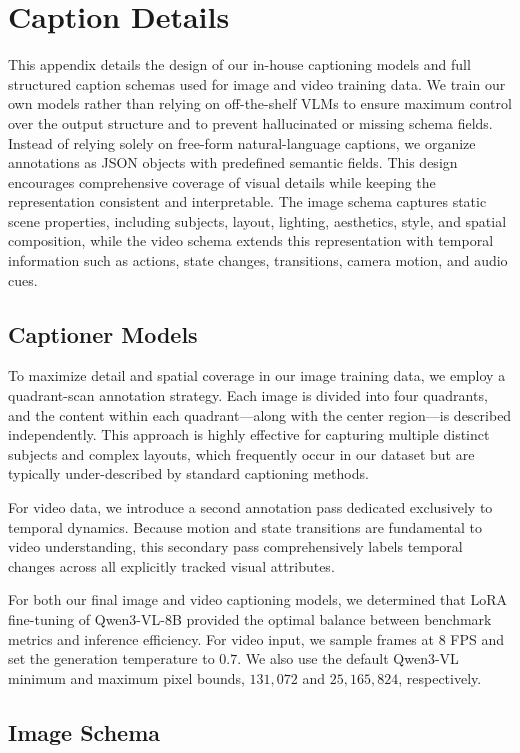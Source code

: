 \section{Caption Details}
\label{appendix:captioning_details}
This appendix details the design of our in-house captioning models and full structured caption schemas used for image and video training data. We train our own models rather than relying on off-the-shelf VLMs to ensure maximum control over the output structure and to prevent hallucinated or missing schema fields. Instead of relying solely on free-form natural-language captions, we organize annotations as JSON objects with predefined semantic fields. This design encourages comprehensive coverage of visual details while keeping the representation consistent and interpretable. The image schema captures static scene properties, including subjects, layout, lighting, aesthetics, style, and spatial composition, while the video schema extends this representation with temporal information such as actions, state changes, transitions, camera motion, and audio cues.

\subsection{Captioner Models}
To maximize detail and spatial coverage in our image training data, we employ a quadrant-scan annotation strategy. Each image is divided into four quadrants, and the content within each quadrant---along with the center region---is described independently. This approach is highly effective for capturing multiple distinct subjects and complex layouts, which frequently occur in our dataset but are typically under-described by standard captioning methods.

For video data, we introduce a second annotation pass dedicated exclusively to temporal dynamics. Because motion and state transitions are fundamental to video understanding, this secondary pass comprehensively labels temporal changes across all explicitly tracked visual attributes.

For both our final image and video captioning models, we determined that LoRA fine-tuning of \mbox{Qwen3-VL-8B} provided the optimal balance between benchmark metrics and inference efficiency. For video input, we sample frames at $8$ FPS and set the generation temperature to $0.7$. We also use the default \mbox{Qwen3-VL} minimum and maximum pixel bounds, $131,072$ and $25,165,824$, respectively.


\subsection{Image Schema}

